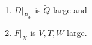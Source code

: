 \documentclass[10pt,a4paper]{amsart}
\newcommand{\BL}{\mathrm{Bl}}
\newcommand{\bP}{\mathbb{P}}
\newcommand{\calO}{\mathcal{O}}
\begin{document}
\begin{lemma}
\begin{enumerate}
		\item $D|_{P_W}$ is $\widetilde{Q}$-large and
		\item $F|_X$ is $V, T, W$-large.
	\end{enumerate}
\end{lemma}
\end{document}
